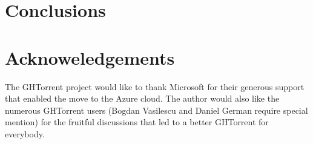 \documentclass{sig-alternate}
\begin{document}
\section{Conclusions}

\section*{Acknoweledgements}

The GHTorrent project would like to thank Microsoft for their generous support
that enabled the move to the Azure cloud. The author would also like the
numerous GHTorrent users (Bogdan Vasilescu and Daniel German require special
mention) for the fruitful discussions that led to a better GHTorrent for
everybody.



\end{document}
